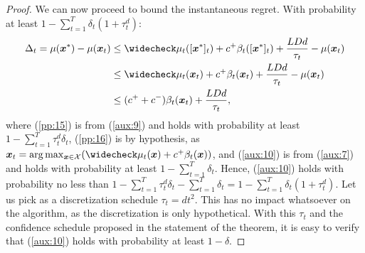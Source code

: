 \documentclass{article}
\begin{document}
\begin{proof}
	We can now proceed to bound the instantaneous regret. With probability at least $1-\sum_{t=1}^T\delta_t(1+\tau_t^d)$:
	\begin{align}
	\Delta_t = \mu(\vx^*) - \mu(\vx_t) &\leq 
	\wc{\mu_t}([\vx^*]_t) + c^{+}\beta_t([\vx^*]_t) + \frac{LDd}{\tau_t} - \mu(\vx_t) \label{pp:15}\\
	&\leq \wc{\mu_t}(\vx_t) + c^{+}\beta_t(\vx_t) + \frac{LDd}{\tau_t} - \mu(\vx_t) \label{pp:16}\\
		&\leq (c^{+}+c^{-})\beta_t(\vx_t) + \frac{LDd}{\tau_t}, \label{aux:10}
	\end{align}
	where (\ref{pp:15}) is from (\ref{aux:9}) and holds with probability at least $1-\sum_{t=1}^{T}\tau_t^d\delta_t$, (\ref{pp:16}) is by hypothesis, as $\vx_t=\arg\max_{\vx\in\Xspace}(\wc{\mu_t}(\vx) + c^{+}\beta_t(\vx))$, and (\ref{aux:10}) is from (\ref{aux:7}) and holds with probability at least $1-\sum_{t=1}^{T}\delta_t$. Hence, (\ref{aux:10}) holds with probability no less than $1-\sum_{t=1}^{T}\tau_t^d\delta_t - \sum_{t=1}^{T}\delta_t = 1 - \sum_{t=1}^T\delta_t(1+\tau_t^d)$. Let us pick as a discretization schedule $\tau_t = dt^2$. This has no impact whatsoever on the algorithm, as the discretization is only hypothetical. With this $\tau_t$ and the confidence schedule proposed in the statement of the theorem, it is easy to verify that (\ref{aux:10}) holds with probability at least $1-\delta$.
	

\end{proof}
\end{document}
